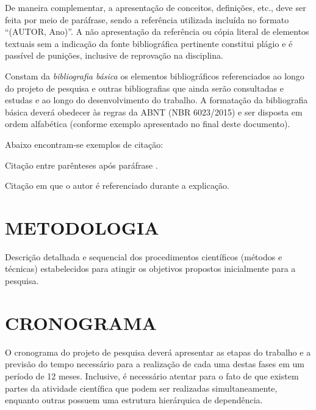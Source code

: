 \documentclass[12pt,a4paper]{article}
\begin{document}
De maneira complementar, a apresentação de conceitos, definições, etc., deve ser feita por meio de paráfrase, sendo a referência utilizada incluída no formato ``(AUTOR, Ano)''. A não apresentação da referência ou cópia literal de elementos textuais sem a indicação da fonte bibliográfica pertinente constitui plágio e é passível de punições, inclusive de reprovação na disciplina.

Constam da {\it bibliografia básica} os elementos bibliográficos referenciados ao longo do projeto de pesquisa e outras bibliografias que ainda serão consultadas e estudas e ao longo do desenvolvimento do trabalho. A formatação da bibliografia básica deverá obedecer às regras da ABNT (NBR 6023/2015) e ser disposta em ordem alfabética (conforme exemplo apresentado no final deste documento).

Abaixo encontram-se exemplos de citação:

Citação entre parênteses após paráfrase \cite{andrade99}.

Citação em que o autor  é referenciado durante a explicação.

\section{METODOLOGIA}
Descrição detalhada e sequencial dos procedimentos científicos (métodos e técnicas) estabelecidos para atingir os objetivos propostos inicialmente para a pesquisa.

\section{CRONOGRAMA}
O cronograma do projeto de pesquisa deverá apresentar as etapas do trabalho e a previsão do tempo necessário para a realização de cada uma destas fases em um período de 12 meses. Inclusive, é necessário atentar para o fato de que existem partes da atividade científica que podem ser realizadas simultaneamente, enquanto outras possuem uma estrutura hierárquica de dependência.

\def\refname{REFERÊNCIAS BIBLIOGRÁFICAS}


\end{document}
